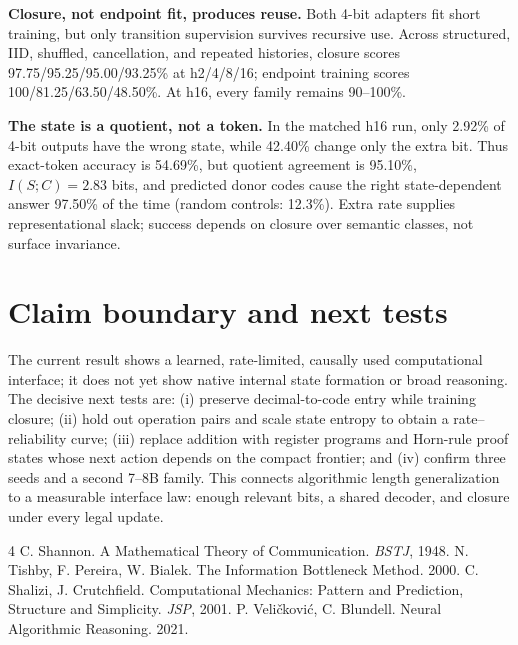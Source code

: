 \documentclass[9pt,twocolumn]{extarticle}
\newcommand{\state}{S}
\newcommand{\code}{C}
\begin{document}
\textbf{Closure, not endpoint fit, produces reuse.}  Both 4-bit adapters fit
short training, but only transition supervision survives recursive use.  Across
structured, IID, shuffled, cancellation, and repeated histories, closure scores
97.75/95.25/95.00/93.25\% at h2/4/8/16; endpoint training scores
100/81.25/63.50/48.50\%.  At h16, every family remains 90--100\%.

\textbf{The state is a quotient, not a token.}  In the matched h16 run, only
2.92\% of 4-bit outputs have the wrong state, while 42.40\% change only the
extra bit.  Thus exact-token accuracy is 54.69\%, but quotient agreement is
95.10\%, $I(\state;\code)=2.83$ bits, and predicted donor codes cause the right
state-dependent answer 97.50\% of the time (random controls: 12.3\%).  Extra
rate supplies representational slack; success depends on closure over semantic
classes, not surface invariance.

\section*{\fontsize{9}{10}\selectfont Claim boundary and next tests}
\vspace{-0.3em}
The current result shows a learned, rate-limited, causally used computational
interface; it does not yet show native internal state formation or broad
reasoning.  The decisive next tests are: (i) preserve decimal-to-code entry
while training closure; (ii) hold out operation pairs and scale state entropy
to obtain a rate--reliability curve; (iii) replace addition with register
programs and Horn-rule proof states whose next action depends on the compact
frontier; and (iv) confirm three seeds and a second 7--8B family.  This connects
algorithmic length generalization \cite{velickovic2021} to a measurable
interface law: enough relevant bits, a shared decoder, and closure under every
legal update.

\vspace{-0.35em}
\begin{thebibliography}{4}
\scriptsize
\setlength{\itemsep}{0pt}
 C. Shannon. A Mathematical Theory of Communication.
\emph{BSTJ}, 1948.
 N. Tishby, F. Pereira, W. Bialek. The Information
Bottleneck Method. 2000.
 C. Shalizi, J. Crutchfield. Computational Mechanics:
Pattern and Prediction, Structure and Simplicity. \emph{JSP}, 2001.
 P. Veli\v{c}kovi\'c, C. Blundell. Neural Algorithmic
Reasoning. 2021.
\end{thebibliography}
\end{document}
